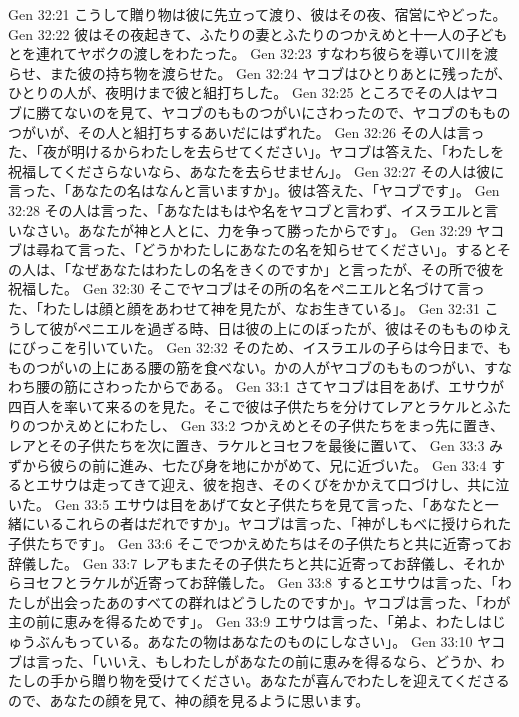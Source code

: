 Gen 32:21  こうして贈り物は彼に先立って渡り、彼はその夜、宿営にやどった。
Gen 32:22  彼はその夜起きて、ふたりの妻とふたりのつかえめと十一人の子どもとを連れてヤボクの渡しをわたった。
Gen 32:23  すなわち彼らを導いて川を渡らせ、また彼の持ち物を渡らせた。
Gen 32:24  ヤコブはひとりあとに残ったが、ひとりの人が、夜明けまで彼と組打ちした。
Gen 32:25  ところでその人はヤコブに勝てないのを見て、ヤコブのもものつがいにさわったので、ヤコブのもものつがいが、その人と組打ちするあいだにはずれた。
Gen 32:26  その人は言った、「夜が明けるからわたしを去らせてください」。ヤコブは答えた、「わたしを祝福してくださらないなら、あなたを去らせません」。
Gen 32:27  その人は彼に言った、「あなたの名はなんと言いますか」。彼は答えた、「ヤコブです」。
Gen 32:28  その人は言った、「あなたはもはや名をヤコブと言わず、イスラエルと言いなさい。あなたが神と人とに、力を争って勝ったからです」。
Gen 32:29  ヤコブは尋ねて言った、「どうかわたしにあなたの名を知らせてください」。するとその人は、「なぜあなたはわたしの名をきくのですか」と言ったが、その所で彼を祝福した。
Gen 32:30  そこでヤコブはその所の名をペニエルと名づけて言った、「わたしは顔と顔をあわせて神を見たが、なお生きている」。
Gen 32:31  こうして彼がペニエルを過ぎる時、日は彼の上にのぼったが、彼はそのもものゆえにびっこを引いていた。
Gen 32:32  そのため、イスラエルの子らは今日まで、もものつがいの上にある腰の筋を食べない。かの人がヤコブのもものつがい、すなわち腰の筋にさわったからである。
Gen 33:1  さてヤコブは目をあげ、エサウが四百人を率いて来るのを見た。そこで彼は子供たちを分けてレアとラケルとふたりのつかえめとにわたし、
Gen 33:2  つかえめとその子供たちをまっ先に置き、レアとその子供たちを次に置き、ラケルとヨセフを最後に置いて、
Gen 33:3  みずから彼らの前に進み、七たび身を地にかがめて、兄に近づいた。
Gen 33:4  するとエサウは走ってきて迎え、彼を抱き、そのくびをかかえて口づけし、共に泣いた。
Gen 33:5  エサウは目をあげて女と子供たちを見て言った、「あなたと一緒にいるこれらの者はだれですか」。ヤコブは言った、「神がしもべに授けられた子供たちです」。
Gen 33:6  そこでつかえめたちはその子供たちと共に近寄ってお辞儀した。
Gen 33:7  レアもまたその子供たちと共に近寄ってお辞儀し、それからヨセフとラケルが近寄ってお辞儀した。
Gen 33:8  するとエサウは言った、「わたしが出会ったあのすべての群れはどうしたのですか」。ヤコブは言った、「わが主の前に恵みを得るためです」。
Gen 33:9  エサウは言った、「弟よ、わたしはじゅうぶんもっている。あなたの物はあなたのものにしなさい」。
Gen 33:10  ヤコブは言った、「いいえ、もしわたしがあなたの前に恵みを得るなら、どうか、わたしの手から贈り物を受けてください。あなたが喜んでわたしを迎えてくださるので、あなたの顔を見て、神の顔を見るように思います。
